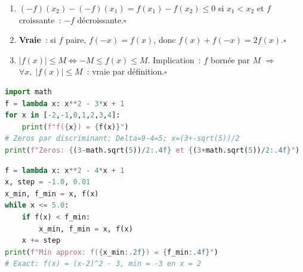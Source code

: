 
\begin{enumerate}
  \item $(-f)(x_2)-(-f)(x_1)=f(x_1)-f(x_2)\leq0$ si $x_1<x_2$ et $f$ croissante~: $-f$ d\'ecroissante.\hfill$\square$
  \item \textbf{Vraie}~: si $f$ paire, $f(-x)=f(x)$, donc $f(x)+f(-x)=2f(x)$.\hfill$\square$
  \item $|f(x)|\leq M\Leftrightarrow-M\leq f(x)\leq M$. Implication~:
        \og $f$ born\'ee par $M$\fg{} $\Rightarrow$
        \og $\forall x,\;|f(x)|\leq M$\fg{}~: vraie par d\'efinition.\hfill$\square$
\end{enumerate}


\begin{lstlisting}[language=Python]
import math
f = lambda x: x**2 - 3*x + 1
for x in [-2,-1,0,1,2,3,4]:
    print(f"f({x}) = {f(x)}")
# Zeros par discriminant: Delta=9-4=5; x=(3+-sqrt(5))/2
print(f"Zeros: {(3-math.sqrt(5))/2:.4f} et {(3+math.sqrt(5))/2:.4f}")
\end{lstlisting}


\begin{lstlisting}[language=Python]
f = lambda x: x**2 - 4*x + 1
x, step = -1.0, 0.01
x_min, f_min = x, f(x)
while x <= 5.0:
    if f(x) < f_min:
        x_min, f_min = x, f(x)
    x += step
print(f"Min approx: f({x_min:.2f}) = {f_min:.4f}")
# Exact: f(x) = (x-2)^2 - 3, min = -3 en x = 2
\end{lstlisting}


